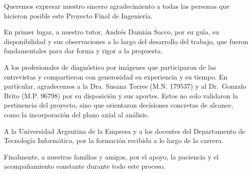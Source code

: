 \begin{Agradecimientos}
Queremos expresar nuestro sincero agradecimiento a todas las personas que hicieron posible este Proyecto Final de Ingenier\'ia.

En primer lugar, a nuestro tutor, Andr\'es Dami\'an Sacco, por su gu\'ia, su disponibilidad y sus observaciones a lo largo del desarrollo del trabajo, que fueron fundamentales para dar forma y rigor a la propuesta.

A los profesionales de diagn\'ostico por im\'agenes que participaron de las entrevistas y compartieron con generosidad su experiencia y su tiempo. En particular, agradecemos a la Dra. Susana Torres (M.N. 179537) y al Dr.~Gonzalo Brito (M.P. 96798) por su disposici\'on y sus aportes. Estos no solo validaron la pertinencia del proyecto, sino que orientaron decisiones concretas de alcance, como la incorporaci\'on del plano axial al an\'alisis.

A la Universidad Argentina de la Empresa y a los docentes del Departamento de Tecnolog\'ia Inform\'atica, por la formaci\'on recibida a lo largo de la carrera.

Finalmente, a nuestras familias y amigos, por el apoyo, la paciencia y el acompa\~namiento constante durante todo este proceso.
\end{Agradecimientos}
